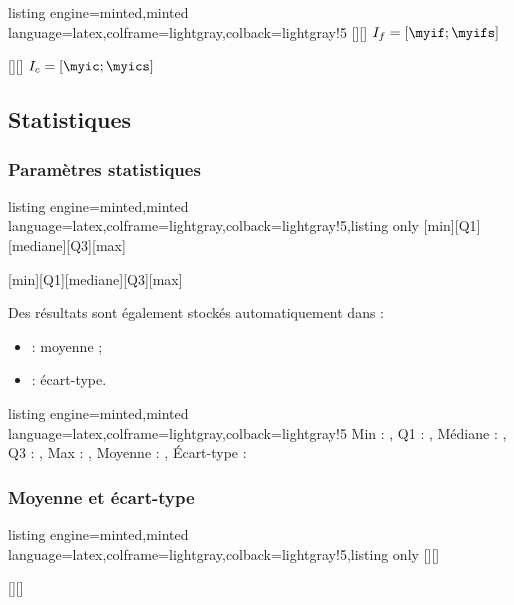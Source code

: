 \documentclass[11pt,a4paper]{ltxdoc}
\begin{document}
\begin{tcblisting}{listing engine=minted,minted language=latex,colframe=lightgray,colback=lightgray!5}
[\myif][\myifs]
$I_f = [\myif;\myifs]$

[\myic][\myics]
$I_c = [\myic;\myics]$
\end{tcblisting}

\subsection{Statistiques}

\subsubsection{Paramètres statistiques}

\begin{tcblisting}{listing engine=minted,minted language=latex,colframe=lightgray,colback=lightgray!5,listing only}
[min][Q1][mediane][Q3][max]

[min][Q1][mediane][Q3][max]
\end{tcblisting}

Des résultats sont également stockés automatiquement dans :

\begin{itemize}
  \item {} : moyenne ;
  \item {} : écart-type.
\end{itemize}

\begin{tcblisting}{listing engine=minted,minted language=latex,colframe=lightgray,colback=lightgray!5}
Min : \monmin, Q1 : \monquartileun, Médiane : \mamediane,
Q3 : \monquartiletrois, Max : \monmax,
Moyenne : \mamoyenne, Écart-type : \monecarttype
\end{tcblisting}

\subsubsection{Moyenne et écart-type}

\begin{tcblisting}{listing engine=minted,minted language=latex,colframe=lightgray,colback=lightgray!5,listing only}
[\moyenne][\ecarttype]

[\moyenne][\ecarttype]
\end{tcblisting}
\end{document}

